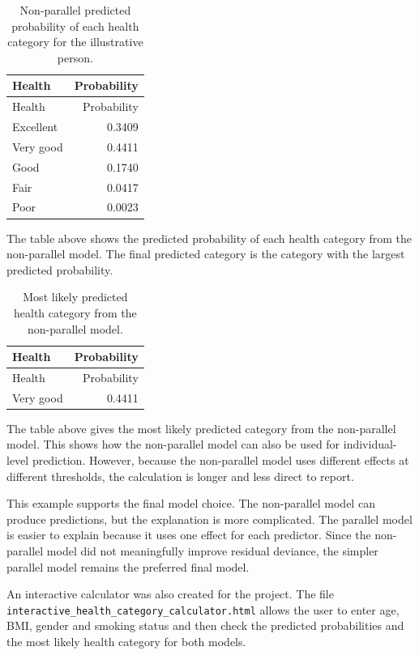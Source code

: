 \documentclass{article}
\begin{document}
\begin{longtable}[]{@{}lr@{}}
\caption{Non-parallel predicted probability of each health category for
the illustrative person.}\tabularnewline
\toprule\noalign{}
Health & Probability \\
\midrule\noalign{}
\endfirsthead
\toprule\noalign{}
Health & Probability \\
\midrule\noalign{}
\endhead
\bottomrule\noalign{}
\endlastfoot
Excellent & 0.3409 \\
Very good & 0.4411 \\
Good & 0.1740 \\
Fair & 0.0417 \\
Poor & 0.0023 \\
\end{longtable}

The table above shows the predicted probability of each health category
from the non-parallel model. The final predicted category is the
category with the largest predicted probability.

\begin{longtable}[]{@{}lr@{}}
\caption{Most likely predicted health category from the non-parallel
model.}\tabularnewline
\toprule\noalign{}
Health & Probability \\
\midrule\noalign{}
\endfirsthead
\toprule\noalign{}
Health & Probability \\
\midrule\noalign{}
\endhead
\bottomrule\noalign{}
\endlastfoot
Very good & 0.4411 \\
\end{longtable}

The table above gives the most likely predicted category from the
non-parallel model. This shows how the non-parallel model can also be
used for individual-level prediction. However, because the non-parallel
model uses different effects at different thresholds, the calculation is
longer and less direct to report.

This example supports the final model choice. The non-parallel model can
produce predictions, but the explanation is more complicated. The
parallel model is easier to explain because it uses one effect for each
predictor. Since the non-parallel model did not meaningfully improve
residual deviance, the simpler parallel model remains the preferred
final model.

An interactive calculator was also created for the project. The file
\texttt{interactive\_health\_category\_calculator.html} allows the user
to enter age, BMI, gender and smoking status and then check the
predicted probabilities and the most likely health category for both
models.
\end{document}
